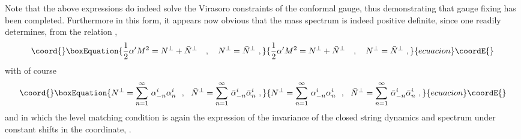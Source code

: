 \documentclass[a4paper,11pt]{article}
\begin{document}
Note that the above expressions do indeed solve the Virasoro constraints
\coordHE{} of the conformal gauge, thus demonstrating that gauge
fixing has been completed. Furthermore in this form, it appears now
obvious that the mass spectrum is indeed positive definite, since one
readily determines, from the relation \coordHE{},
\begin{equation}\coord{}\boxEquation{
\frac{1}{2}\alpha' M^2=N^\perp+\bar{N}^\perp\ \ \ ,\ \ \ 
N^\perp=\bar{N}^\perp\ ,
}{
\frac{1}{2}\alpha' M^2=N^\perp+\bar{N}^\perp\ \ \ ,\ \ \ 
N^\perp=\bar{N}^\perp\ ,
}{ecuacion}\coordE{}\end{equation}
with of course
\begin{equation}\coord{}\boxEquation{
N^\perp=\sum_{n=1}^\infty\,\alpha^i_{-n}\alpha^i_n\ \ ,\ \ 
\bar{N}^\perp=\sum_{n=1}^\infty\,\bar{\alpha}^i_{-n}\bar{\alpha}^i_n\ ,
}{
N^\perp=\sum_{n=1}^\infty\,\alpha^i_{-n}\alpha^i_n\ \ ,\ \ 
\bar{N}^\perp=\sum_{n=1}^\infty\,\bar{\alpha}^i_{-n}\bar{\alpha}^i_n\ ,
}{ecuacion}\coordE{}\end{equation}
and in which the level matching condition is again the expression of the
invariance of the closed string dynamics and spectrum under constant
shifts in the \myHighlight{$\sigma$}\coordHE{} coordinate, \coordHE{}.

\vspace{10pt}
\end{document}
